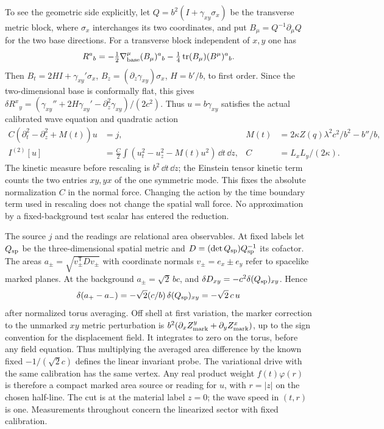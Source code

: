 To see the geometric side explicitly, let \(Q=b^2(I+\gamma_{xy}\sigma_x)\) be the transverse metric block, where \(\sigma_x\) interchanges its two coordinates, and put \(B_\mu=Q^{-1}\partial_\mu Q\) for the two base directions. For a transverse block independent of \(x,y\) one has
\[
 R^a{}_b=-\tfrac12\nabla^\mu_{\rm base}(B_\mu)^a{}_b
         -\tfrac14\operatorname{tr}(B_\mu)(B^\mu)^a{}_b .
\]
Then \(B_t=2H I+\gamma_{xy}'\sigma_x\), \(B_z=(\partial_z\gamma_{xy})\sigma_x\), \(H=b'/b\), to first order. Since the two-dimensional base is conformally flat, this gives
\(\delta R^x{}_y=(\gamma_{xy}''+2H\gamma_{xy}'-\partial_z^2\gamma_{xy})/(2c^2)\).
Thus \(u=b\gamma_{xy}\) satisfies the actual calibrated wave equation and quadratic action
\begin{align}
 C(\partial_t^2-\partial_z^2+M(t))u&=j,
 & M(t)&=2\kappa Z(q)\lambda^2c^2/b^2-b''/b,\label{eq:wave}\\
 I^{(2)}[u]&=\frac C2\int (u_t^2-u_z^2-M(t)u^2)\,\dd t\,\dd z,
 & C&=L_xL_y/(2\kappa).\label{eq:act}
\end{align}
The kinetic measure before rescaling is \(b^2\,\dd t\,\dd z\); the Einstein tensor kinetic term counts the two entries \(xy,yx\) of the one symmetric mode. This fixes the absolute normalization \(C\) in the normal force. Changing the action by the time boundary term used in rescaling does not change the spatial wall force. No approximation by a fixed-background test scalar has entered the reduction.

The source \(j\) and the readings are relational area observables. At fixed labels let \(Q_{\rm sp}\) be the three-dimensional spatial metric and \(D=(\det Q_{\rm sp})Q_{\rm sp}^{-1}\) its cofactor. The areas \(a_\pm=\sqrt{v_\pm^{\mathsf T}D v_\pm}\) with coordinate normals \(v_\pm=e_x\pm e_y\) refer to spacelike marked planes. At the background \(a_\pm=\sqrt2\,bc\), and \(\delta D_{xy}=-c^2\delta(Q_{\rm sp})_{xy}\). Hence
\begin{equation}
 \delta(a_+-a_-)=-\sqrt2(c/b)\,\delta(Q_{\rm sp})_{xy}
     =-\sqrt2\,c\,u
 \label{eq:area}
\end{equation}
after normalized torus averaging. Off shell at first variation, the marker correction to the unmarked \(xy\) metric perturbation is \(b^2(\partial_x Z^y_{\rm mark}+\partial_y Z^x_{\rm mark})\), up to the sign convention for the displacement field. It integrates to zero on the torus, before any field equation. Thus multiplying the averaged area difference by the known fixed \(-1/(\sqrt2 c)\) defines the linear invariant probe. The variational drive with the same calibration has the same vertex. Any real product weight \(f(t)\varphi(r)\) is therefore a compact marked area source or reading for \(u\), with \(r=|z|\) on the chosen half-line. The cut is at the material label \(z=0\); the wave speed in \((t,r)\) is one. Measurements throughout concern the linearized sector with fixed calibration.
